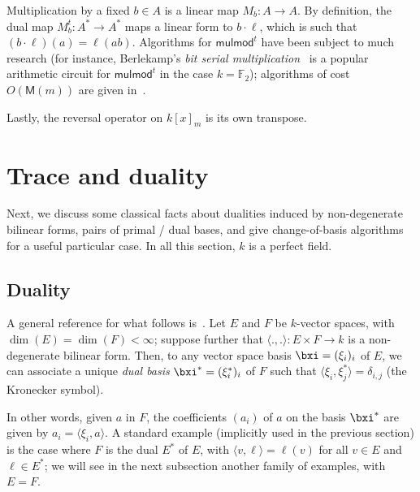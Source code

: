 \documentclass{sig-alternate}
\def\M {\ensuremath{\mathsf{M}}}
\def\F {\ensuremath{\mathbb{F}}}
\def\mulmod {\ensuremath{\mathsf{mulmod}}}
\newcounter{algo}
\newcommand{\ang}[1]{\langle#1\rangle}
\begin{document}
Multiplication by a fixed $b\in A$ is a linear map $M_b:A\to A$. By
definition, the dual map $M_b^t: A^* \to A^*$ maps a linear form to $b
\cdot \ell$, which is such that $(b \cdot \ell)(a)
=\ell(ab)$. Algorithms for $\mulmod^t$ have been subject to much
research (for instance, Berlekamp's \emph{bit serial
  multiplication}~\cite{Berlekamp82} is a popular arithmetic circuit
for $\mulmod^t$ in the case $k=\F_2$); algorithms of cost $O(\M(m))$
are given in~\cite{shoup99,bostan+lecerf+schost:tellegen}. 

Lastly, the reversal operator on $k[x]_m$ is its own transpose.


\section{Trace and duality}\label{sec:trace}

Next, we discuss some classical facts about dualities induced by
non-degenerate bilinear forms, pairs of primal / dual bases, and give
change-of-basis algorithms for a useful particular case. In all this
section, $k$ is a perfect field.


\subsection{Duality}\label{ssec:duality}

A general reference for what follows
is~\cite[Ch.~IX.1.8]{BourbakiAlgCom9}. Let $E$ and $F$ be $k$-vector
spaces, with $\dim(E)=\dim(F) < \infty$; suppose further that
$\ang{.,.}: E\times F \to k$ is a non-degenerate bilinear form.
Then, to any vector space basis $\bxi=(\xi_i)_i$ of $E$, we
can associate a unique \emph{dual basis}
$\bxi^\ast=(\xi_i^\ast)_i$ of $F$ such that $
\ang{\xi_i,\xi^\ast_j} = \delta_{i,j}$ (the Kronecker symbol).

In other words, given $a$ in $F$, the coefficients $(a_i)$ of $a$ on
the basis $\bxi^\ast$ are given by $a_i=\ang{\xi_i, a}$. A
standard example (implicitly used in the previous section) is the case
where $F$ is the dual $E^*$ of $E$, with $\ang{v,\ell}=\ell(v)$ for
all $v\in E$ and $\ell \in E^*$; we will see in the next subsection
another family of examples, with $E=F$.
\end{document}
